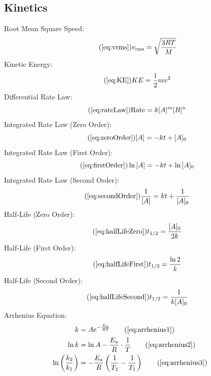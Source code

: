     \subsection{Kinetics}
        Root Mean Square Speed:
        \begin{equation}\tag{\ref{eq:vrms}}
             v_\text{rms} = \sqrt{\frac{3RT}{M}}
        \end{equation}
        Kinetic Energy:
        \begin{equation}\tag{\ref{eq:KE}}
            KE = \frac{1}{2}mv^2
        \end{equation}
        Differential Rate Law:
        \begin{equation}\tag{\ref{eq:rateLaw}}
            \text{Rate} = k[A]^m[B]^n
        \end{equation}
        Integrated Rate Law (Zero Order):
        \begin{equation}\tag{\ref{eq:zeroOrder}}
            [A] = -kt + [A]_0
        \end{equation}
        Integrated Rate Law (First Order):
        \begin{equation}\tag{\ref{eq:firstOrder}}
            \ln{[A]} = -kt + \ln{[A]_0}
        \end{equation}
        Integrated Rate Law (Second Order):
        \begin{equation}\tag{\ref{eq:secondOrder}}
            \frac{1}{[A]} = kt + \frac{1}{[A]_0}
        \end{equation}
        Half-Life (Zero Order):
        \begin{equation}\tag{\ref{eq:halfLifeZero}}
            t_{1/2} = \frac{[A]_0}{2k}
        \end{equation}
        Half-Life (First Order):
        \begin{equation}\tag{\ref{eq:halfLifeFirst}}
            t_{1/2} = \frac{\ln{2}}{k}
        \end{equation}
        Half-Life (Second Order):
        \begin{equation}\tag{\ref{eq:halfLifeSecond}}
            t_{1/2} = \frac{1}{k[A]_0}
        \end{equation}
        Arrhenius Equation:
        \begin{align}
            k &= Ae^{-\frac{E_a}{RT}} \tag{\ref{eq:arrhenius1}}\\
            \ln{k} &= \ln{A} - \frac{E_a}{R}\cdot\frac{1}{T} \tag{\ref{eq:arrhenius2}}\\
            \ln{\left(\frac{k_2}{k_1}\right)} &= -\frac{E_a}{R}\left(\frac{1}{T_2} - \frac{1}{T_1}\right) \tag{\ref{eq:arrhenius3}}
        \end{align}
